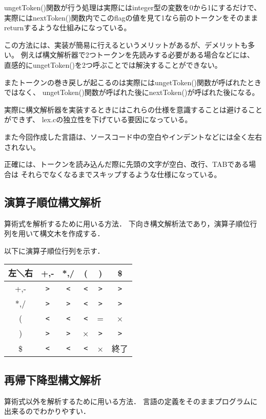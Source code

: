 \documentclass[11pt,a4j]{jarticle}
\begin{document}
ungetToken()関数が行う処理は実際にはinteger型の変数を0から1にするだけで、
実際にはnextToken()関数内でこのflagの値を見て1なら前のトークンをそのまま
returnするような仕組みになっている。

この方法には、実装が簡易に行えるというメリットがあるが、デメリットも多い。
例えば構文解析器で2つトークンを先読みする必要がある場合などには、
直感的にungetToken()を2つ呼ぶことでは解決することができない。

またトークンの巻き戻しが起こるのは実際にはungetToken()関数が呼ばれたときではなく、
ungetToken()関数が呼ばれた後にnextToken()が呼ばれた後になる。

実際に構文解析器を実装するときにはこれらの仕様を意識することは避けることができず、
lex.cの独立性を下げている要因になっている。


\vspace{0.2in}

また今回作成した言語は、ソースコード中の空白やインデントなどには全く左右されない。

正確には、トークンを読み込んだ際に先頭の文字が空白、改行、TABである場合は
それらでなくなるまでスキップするような仕様になっている。



\subsection{演算子順位構文解析}
算術式を解析するために用いる方法．
下向き構文解析法であり，演算子順位行列を用いて構文木を作成する．

以下に演算子順位行列を示す．
\begin{table}[h]
\centering
\begin{tabular}{|c|c|c|c|c|c|}\hline
左＼右 & +,- & *,/ & ( & ) & \$\\ \hline
+,- & \verb|>| & \verb|<| & \verb|<| & \verb|>| & \verb|>| \\ \hline
*,/ & \verb|>| & \verb|>| & \verb|<| & \verb|>| & \verb|>| \\ \hline
( & \verb|<| & \verb|<| & \verb|<| & = & × \\ \hline
) & \verb|>| & \verb|>| & × & \verb|>| & \verb|>| \\ \hline
\$ & \verb|<| & \verb|<| & \verb|<| & × & 終了 \\ \hline
\end{tabular}
\end{table}


\subsection{再帰下降型構文解析}
算術式以外を解析するために用いる方法．
言語の定義をそのままプログラムに出来るのでわかりやすい．
\end{document}
